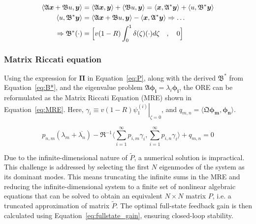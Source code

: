 \begin{equation} \label{eq:B*}
    \begin{aligned}
        \langle \mathfrak{A} \bm{x} + \mathfrak{B} u, \bm{y} \rangle
        &= \langle \mathfrak{A} \bm{x}, \bm{y} \rangle
        + \langle \mathfrak{B} u, \bm{y} \rangle
        = \langle \bm{x}, \mathfrak{A}^* \bm{y}\rangle
        + \langle u, \mathfrak{B}^* \bm{y} \rangle \\
        \langle u, \mathfrak{B}^* \bm{y} \rangle
        &= \langle \mathfrak{A} \bm{x} + \mathfrak{B} u, \bm{y} \rangle
        - \langle \bm{x}, \mathfrak{A}^* \bm{y}\rangle
        \Rightarrow \hdots \\ \Rightarrow \mathfrak{B}^* (\cdot) &= \Bigl[ v(1-R) \int_0^1 \delta(\zeta) (\cdot) d\zeta \quad , \quad 0 \Bigr]
    \end{aligned}
\end{equation}

\subsubsection{Matrix Riccati equation}

Using the expression for $\mathbf{\Pi}$ in Equation~\ref{eq:P}, along with the derived $\mathfrak{B}^*$ from Equation~\ref{eq:B*}, and the eigenvalue problem $\mathfrak{A}\bm{\phi_i} = \lambda_i \bm{\phi_i}$, the ORE can be reformulated as the Matrix Riccati Equation (MRE) shown in Equation~\ref{eq:MRE}. Here, $\gamma_i \equiv v(1-R) \left. \psi_{1}^{(i)} \right|_{\zeta = 0}$, and $q_{m,n} = \langle \mathfrak{Q} \bm{\phi_m}, \bm{\phi_n} \rangle$.

\begin{equation}\label{eq:MRE}
    p_{n,m} (\lambda_m + \overline{\lambda_n})
    - \mathfrak{R}^{-1} \langle \sum_{i=1}^\infty p_{i,m} \gamma_i, \sum_{i=1}^\infty p_{i,n} \gamma_i \rangle
    + q_{m,n} = 0
\end{equation}

Due to the infinite-dimensional nature of $\tilde{P}$, a numerical solution is impractical. This challenge is addressed by selecting the first $N$ eigenmodes of the system as its dominant modes. This means truncating the infinite sums in the MRE and reducing the infinite-dimensional system to a finite set of nonlinear algebraic equations that can be solved to obtain an equivalent $N \times N$ matrix $P$, i.e. a truncated approximation of matrix $\tilde{P}$. The optimal full-state feedback gain is then calculated using Equation~\ref{eq:fullstate_gain}, ensuring closed-loop stability.

